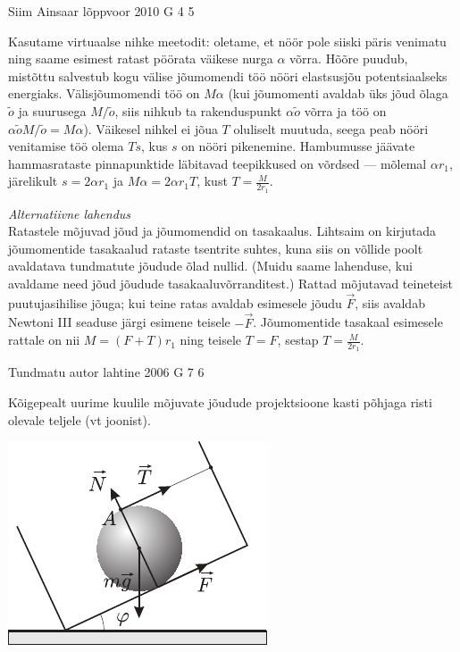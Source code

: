 \documentclass[11pt, twoside]{article}
\begin{document}
{%
{Siim Ainsaar} %
{lõppvoor} %
{2010} %
{G 4} %
{5} %
{

\ifSolution
Kasutame virtuaalse nihke meetodit: oletame, et nöör pole siiski päris venimatu ning
saame esimest ratast pöörata väikese nurga $\alpha$ võrra. Hõõre puudub,
mistõttu salvestub kogu välise jõumomendi töö nööri elastsusjõu potentsiaalseks
energiaks. Välisjõumomendi töö on $M \alpha$ (kui jõumomenti avaldab üks jõud
õlaga $\tilde o$ ja suurusega $M / \tilde o$, siis nihkub ta rakenduspunkt $\alpha
\tilde o$ võrra ja töö on $\alpha \tilde o M / \tilde o = M \alpha$). Väikesel
nihkel ei jõua $T$ oluliselt muutuda, seega peab nööri venitamise töö olema $T
s$, kus $s$ on nööri pikenemine. Hambumusse jäävate hammasrataste pinnapunktide
läbitavad teepikkused on võrdsed --- mõlemal $\alpha r_1$, järelikult $s = 2
\alpha r_1$ ja $M \alpha = 2 \alpha r_1 T$, kust $T = \frac{M}{2 r_1}$.

\vspace{0.5\baselineskip}
\textit{Alternatiivne lahendus}\\
Ratastele mõjuvad jõud ja jõumomendid on tasakaalus. Lihtsaim on kirjutada
jõumomentide tasakaalud rataste tsentrite suhtes, kuna siis on võllide poolt
avaldatava tundmatute jõudude õlad nullid. (Muidu saame lahenduse, kui avaldame
need jõud jõudude tasakaaluvõrranditest.) Rattad mõjutavad teineteist
puutujasihilise jõuga; kui teine ratas avaldab esimesele jõudu $\vec F$, siis
avaldab Newtoni III seaduse järgi esimene teisele $-\vec F$. Jõumomentide
tasakaal esimesele rattale on nii $M = (F+T) r_1$ ning teisele $T=F$, sestap
$T = \frac{M}{2 r_1}$.
\fi
}

{Tundmatu autor} %
{lahtine} %
{2006} %
{G 7} %
{6} %
{

\ifSolution
Kõigepealt uurime kuulile mõjuvate jõudude projektsioone kasti põhjaga risti olevale teljele (vt joonist).

\begin{center}
	\includegraphics[width=0.5\linewidth]{2006-lahg-07-lah}
\end{center}

}}
\end{document}
